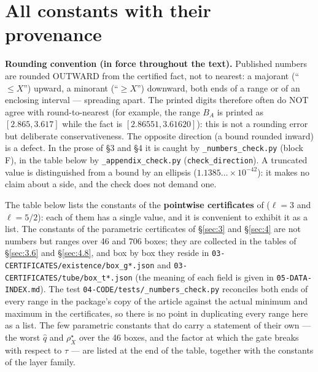 \clearpage
\appendix

\section{All constants with their provenance}
\label{sec:A}

\textbf{Rounding convention (in force throughout the text).} Published numbers are
rounded OUTWARD from the certified fact, not to nearest: a majorant (``$\le X$'')
upward, a minorant (``$\ge X$'') downward, both ends of a range or of an enclosing
interval --- spreading apart. The printed digits therefore often do NOT agree
with round-to-nearest (for example, the range $B_A$ is printed as
$[2.865, 3.617]$ while the fact is $[2.86551, 3.61620]$): this is not a
rounding error but deliberate conservativeness. The opposite direction (a
bound rounded inward) is a defect. In the prose of \S3 and \S4 it is caught by \texttt{\_numbers\_check.py} (block F), in the table below by \texttt{\_appendix\_check.py} (\texttt{check\_direction}). A truncated value is distinguished from a bound by an ellipsis ($1.1385\ldots\times 10^{-42}$): it makes no claim about a side, and the check does not demand one.

The table below lists the constants of the \textbf{pointwise certificates} of 
($\ell = 3$ and $\ell = 5/2$): each of them has a single value, and it is convenient to
exhibit it as a list. The constants of the parametric certificates of \S\ref{sec:3} and
\S\ref{sec:4} are not numbers but ranges over 46 and 706 boxes; they are collected in the
tables of \S\ref{sec:3.6} and \S\ref{sec:4.8}, and box by box they reside in
\texttt{03-\allowbreak CERTIFICATES/\allowbreak existence/\allowbreak box\_\allowbreak g*.json} and \texttt{03-\allowbreak CERTIFICATES/\allowbreak tube/\allowbreak box\_\allowbreak t*.json}
(the meaning of each field is given in \texttt{05-\allowbreak DATA-\allowbreak INDEX.md}). The test
\texttt{04-\allowbreak CODE/\allowbreak tests/\allowbreak \_\allowbreak numbers\_\allowbreak check.py} reconciles both ends of every range in the
package's copy of the article against the actual minimum and maximum in the
certificates, so there
is no point in duplicating every range here as a list. The few parametric
constants that do carry a statement of their own --- the worst $\hat q$ and
$\rho^{\star}_{X}$ over the 46 boxes, and the factor at which the gate breaks
with respect to $\tau$ --- are listed at the end of the table, together with
the constants of the layer family.

